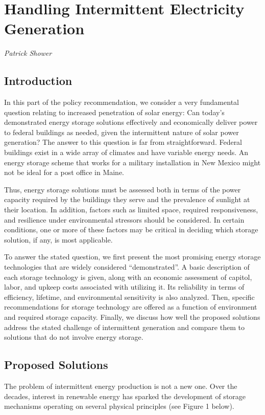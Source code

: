 \section{Handling Intermittent Electricity Generation}
\textit{Patrick Shower}

\subsection{Introduction}

In this part of the policy recommendation, we consider a very fundamental 
question relating to increased penetration of solar energy: Can today’s
demonstrated energy storage solutions effectively and economically deliver
power to federal buildings as needed, given the intermittent nature of solar
power generation? The answer to this question is far from straightforward.
Federal buildings exist in a wide array of climates and have variable energy
needs. An energy storage scheme that works for a military installation in New
Mexico might not be ideal for a post office in Maine.

Thus, energy storage solutions must be assessed both in terms of the power
capacity required by the buildings they serve and the prevalence of sunlight at
their location. In addition, factors such as limited space, required
responsiveness, and resilience under environmental stressors should be
considered. In certain conditions, one or more of these factors may be critical
in deciding which storage solution, if any, is most applicable.

To answer the stated question, we first present the most promising energy
storage technologies that are widely considered ``demonstrated''. A basic
description of each storage technology is given, along with an economic
assessment of capitol, labor, and upkeep costs associated with utilizing it.
Its reliability in terms of efficiency, lifetime, and environmental sensitivity
is also analyzed. Then, specific recommendations for storage technology are
offered as a function of environment and required storage capacity. Finally, we
discuss how well the proposed solutions address the stated challenge of
intermittent generation and compare them to solutions that do not involve
energy storage.

\subsection{Proposed Solutions}

The problem of intermittent energy production is not a new one. Over the
decades, interest in renewable energy has sparked the development of storage
mechanisms operating on several physical principles (see Figure 1 below).

